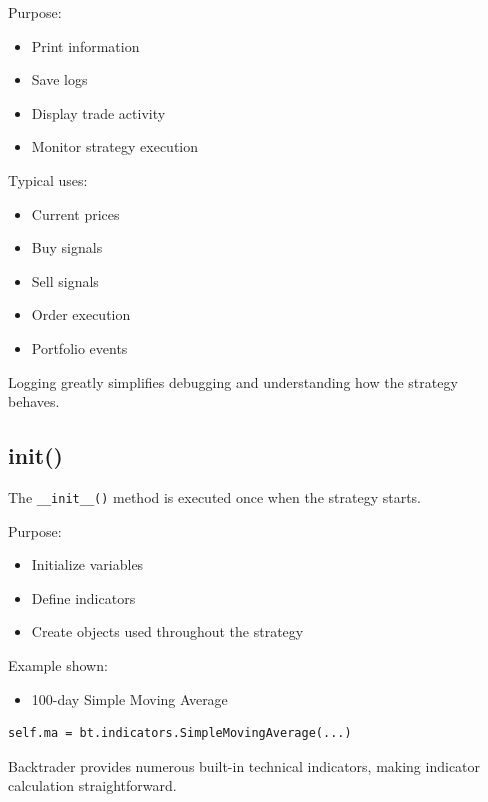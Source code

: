 \documentclass[12pt,openany]{book}
\begin{document}
Purpose:

\begin{itemize}[leftmargin=*]
    \item Print information
    \item Save logs
    \item Display trade activity
    \item Monitor strategy execution
\end{itemize}

Typical uses:

\begin{itemize}[leftmargin=*]
    \item Current prices
    \item Buy signals
    \item Sell signals
    \item Order execution
    \item Portfolio events
\end{itemize}

Logging greatly simplifies debugging and understanding how the strategy behaves.

\subsection{init()}

The \texttt{\_\_init\_\_()} method is executed once when the strategy starts.

Purpose:

\begin{itemize}[leftmargin=*]
    \item Initialize variables
    \item Define indicators
    \item Create objects used throughout the strategy
\end{itemize}

Example shown:

\begin{itemize}[leftmargin=*]
    \item 100-day Simple Moving Average
\end{itemize}

\begin{Verbatim}[breaklines=true,breakanywhere=true,fontsize=\small]
self.ma = bt.indicators.SimpleMovingAverage(...)
\end{Verbatim}

Backtrader provides numerous built-in technical indicators, making indicator calculation straightforward.
\end{document}
